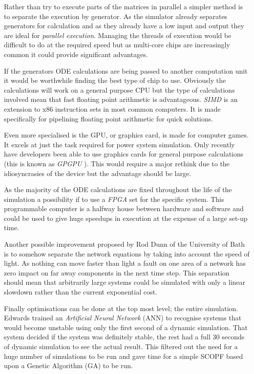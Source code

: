 \documentclass[a4paper,oneside,12pt]{report}
\begin{document}
Rather than try to execute parts of the matrices in parallel a simpler method is to separate the execution by generator. As the simulator already separates generators for calculation and as they already have a low input and output they are ideal for \emph{parallel execution}. Managing the threads of execution would be difficult to do at the required speed but as multi-core chips are increasingly common it could provide significant advantages.

If the generators ODE calculations are being passed to another computation unit it would be worthwhile finding the best type of chip to use. Obviously the calculations will work on a general purpose CPU but the type of calculations involved mean that fast floating point arithmetic is advantageous. \emph{SIMD} is an extension to x86 instruction sets in most common computers. It is made specifically for pipelining floating point arithmetic for quick solutions.

Even more specialised is the GPU, or graphics card, is made for computer games. It excels at just the task required for power system simulation. Only recently have developers been able to use graphics cards for general purpose calculations (this is known as \emph{GPGPU} \cite{Che2008}). This would require a major rethink due to the idiosyncrasies of the device but the advantage should be large.

As the majority of the ODE calculations are fixed throughout the life of the simulation a possibility if to use a \emph{FPGA} set for the specific system. This programmable computer is a halfway house between hardware and software and could be used to give huge speedups in execution at the expense of a large set-up time.

Another possible improvement proposed by Rod Dunn of the University of Bath is to somehow separate the network equations by taking into account the speed of light. As nothing can move faster than light a fault on one area of a network has zero impact on far away components in the next time step. This separation should mean that arbitrarily large systems could be simulated with only a linear slowdown rather than the current exponential cost.

Finally optimisations can be done at the top most level; the entire simulation. Edwards \cite{Edwards1995} trained an \emph{Artificial Neural Network} (ANN) to recognise systems that would become unstable using only the first second of a dynamic simulation. That system decided if the system was definitely stable, the rest had a full 30 seconds of dynamic simulation to see the actual result. This filtered out the need for a huge number of simulations to be run and gave time for a simple SCOPF based upon a Genetic Algorithm (GA) to be run.
\end{document}
